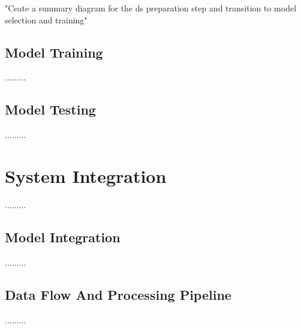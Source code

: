 "Ceate a summary diagram for the ds preparation step and transition to model selection and training"

\subsection{Model Training}
.........
\subsection{Model Testing}
.........



\section{System Integration}
.........
\subsection{Model Integration}
.........
\subsection{Data Flow And Processing Pipeline}
.........

